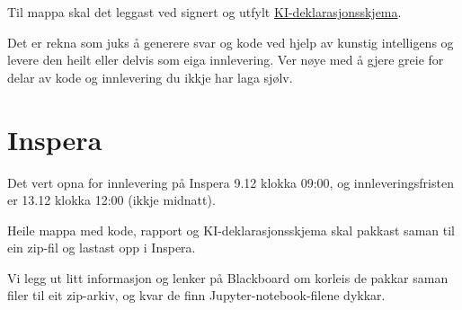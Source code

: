 \documentclass[12pt, titlepage]{article}
\begin{document}
Til mappa skal det leggast ved signert og utfylt \href{https://i.ntnu.no/documents/portlet_file_entry/1305837853/NO_KI+-+deklareringsskjema+per+v%C3%A5r+2024.pdf/3b07aee3-d348-4360-e595-057ec480f1a3}{KI-deklarasjonsskjema}.

Det er rekna som juks å generere svar og kode ved hjelp av kunstig intelligens og levere den heilt eller delvis som eiga innlevering.
Ver nøye med å gjere greie for delar av kode og innlevering du ikkje har laga sjølv.

\section*{Inspera}

Det vert opna for innlevering på Inspera 9.12 klokka 09:00, og innleveringsfristen er 13.12 klokka 12:00 (ikkje midnatt).

Heile mappa med kode, rapport og KI-deklarasjonsskjema skal pakkast saman til ein zip-fil og lastast opp i Inspera.

Vi legg ut litt informasjon og lenker på Blackboard om korleis de pakkar saman filer til eit zip-arkiv, og kvar de finn Jupyter-notebook-filene dykkar.
\end{document}

